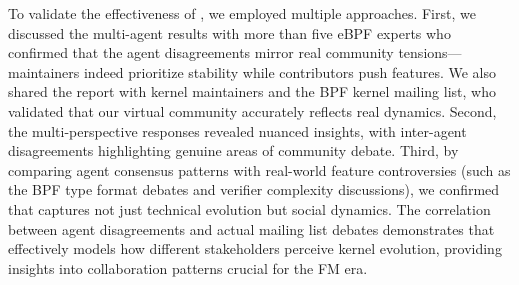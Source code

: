 To validate the effectiveness of \sys, we employed multiple approaches. First, we discussed the multi-agent results with more than five eBPF experts who confirmed that the agent disagreements mirror real community tensions—maintainers indeed prioritize stability while contributors push features. We also shared the report with kernel maintainers and the BPF kernel mailing list, who validated that our virtual community accurately reflects real dynamics. Second, the multi-perspective responses revealed nuanced insights, with inter-agent disagreements highlighting genuine areas of community debate. Third, by comparing agent consensus patterns with real-world feature controversies (such as the BPF type format debates and verifier complexity discussions), we confirmed that \sys captures not just technical evolution but social dynamics. The correlation between agent disagreements and actual mailing list debates demonstrates that \sys effectively models how different stakeholders perceive kernel evolution, providing insights into collaboration patterns crucial for the FM era.

% 
% 